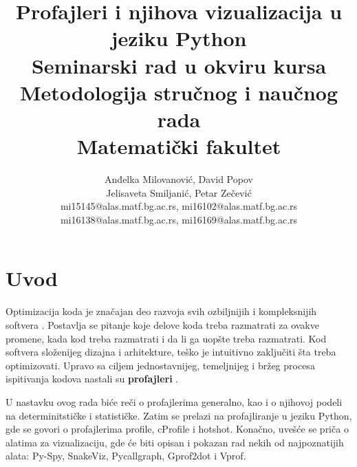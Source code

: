 \documentclass[a4paper]{article}
\begin{document}
\title{Profajleri i njihova vizualizacija u jeziku Python\\ \small{Seminarski rad u okviru kursa\\Metodologija stručnog i naučnog rada\\ Matematički fakultet}}

\author{
Anđelka Milovanović, David Popov \\
Jelisaveta Smiljanić, Petar Zečević \\
mi15145@alas.matf.bg.ac.rs, mi16102@alas.matf.bg.ac.rs \\
mi16138@alas.matf.bg.ac.rs, mi16169@alas.matf.bg.ac.rs 
}


\maketitle


\setcounter{tocdepth}{2} 
\tableofcontents

\newpage
\section{Uvod}
\label{sec:uvod}

Optimizacija koda je značajan deo razvoja svih ozbiljnijih i kompleksnijih softvera \cite{opt}. Postavlja se pitanje koje delove koda treba razmatrati za ovakve promene, kada kod treba razmatrati i da li ga uopšte treba razmatrati. Kod softvera složenijeg dizajna i arhitekture, teško je intuitivno zaključiti šta treba optimizovati. Upravo sa ciljem jednostavnijeg, temeljnijeg i bržeg procesa ispitivanja kodova nastali su \textbf{profajleri} \cite{profiling}.

U nastavku ovog rada biće reči o profajlerima generalno, kao i o njihovoj podeli na  determinitstičke i statističke. Zatim se prelazi na profajliranje u jeziku Python, gde se govori o profajlerima profile, cProfile i hotshot. Konačno, uvešće se priča o alatima za vizualizaciju, gde će biti opisan i pokazan rad nekih od najpoznatijih alata: Py-Spy, SnakeViz, Pycallgraph, Gprof2dot i Vprof.
\end{document}

